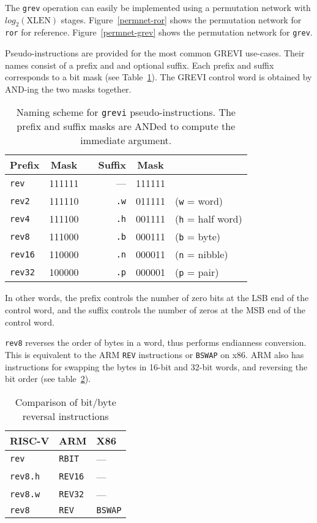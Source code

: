 The {\tt grev} operation can easily be implemented using a permutation
network with $log_2(\textrm{XLEN})$ stages. Figure~\ref{permnet-ror}
shows the permutation network for {\tt ror} for reference.
Figure~\ref{permnet-grev} shows the permutation network for {\tt grev}.

Pseudo-instructions are provided for the most common GREVI use-cases. Their names
consist of a prefix and and optional suffix. Each prefix and suffix corresponds
to a bit mask (see Table~\ref{grevi-names}). The GREVI control word is obtained
by AND-ing the two masks together.

\begin{table}[!h]
\begin{center}
\begin{tabular}{lcp{1cm}rcl}
Prefix & Mask & & Suffix & Mask \\
\hline
{\tt rev}   & 111111 & &      --- & 111111 \\
{\tt rev2}  & 111110 & & {\tt .w} & 011111 & ({\tt w} = word)\\
{\tt rev4}  & 111100 & & {\tt .h} & 001111 & ({\tt h} = half word)\\
{\tt rev8}  & 111000 & & {\tt .b} & 000111 & ({\tt b} = byte)\\
{\tt rev16} & 110000 & & {\tt .n} & 000011 & ({\tt n} = nibble)\\
{\tt rev32} & 100000 & & {\tt .p} & 000001 & ({\tt p} = pair)\\
\end{tabular}
\end{center}
\caption{Naming scheme for {\tt grevi} pseudo-instructions. The prefix and
suffix masks are ANDed to compute the immediate argument.}
\label{grevi-names}
\end{table}

In other words, the prefix controls the number of zero bits at the LSB end of the
control word, and the suffix controls the number of zeros at the MSB end of the control
word.

{\tt rev8} reverses the order of bytes in a word, thus performs endianness conversion. This
is equivalent to the ARM {\tt REV} instructions or {\tt BSWAP} on x86. ARM also has instructions
for swapping the bytes in 16-bit and 32-bit words, and reversing the bit order (see table~\ref{grevi-cmp}).

\begin{table}[h]
\begin{center}
\begin{tabular}{l|l|l}
RISC-V & ARM & X86 \\
\hline
{\tt rev}    & {\tt RBIT}  & --- \\
{\tt rev8.h} & {\tt REV16} & --- \\
{\tt rev8.w} & {\tt REV32} & --- \\
{\tt rev8}   & {\tt REV}   & {\tt BSWAP} \\
\end{tabular}
\end{center}
\caption{Comparison of bit/byte reversal instructions}
\label{grevi-cmp}
\end{table}

